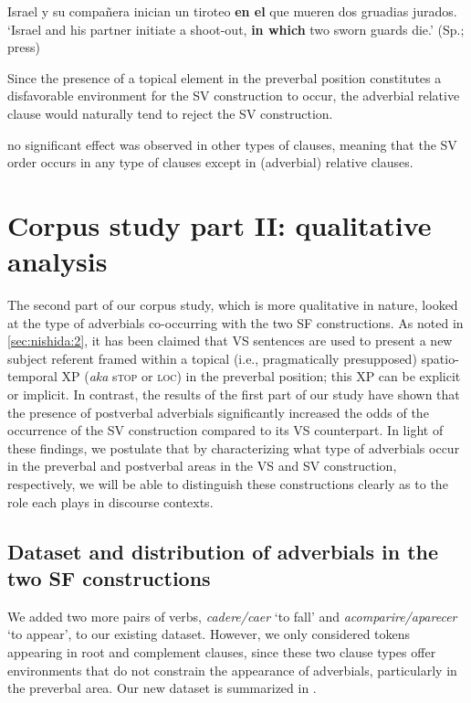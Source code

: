 \documentclass[output=paper,colorlinks,citecolor=brown,
]{langscibook}
\begin{document}
{\begin{exe}
\ex\label{ex:nishida:ii}
Israel y su compañera inician un tiroteo \textbf{en el} que mueren dos gruadias jurados. 
        \glt ‘Israel and his partner initiate a shoot-out, \textbf{in which} two sworn guards die.’ (Sp.; press)  
\end{exe}

Since the presence of a topical element in the preverbal position constitutes a disfavorable environment for the SV construction to occur, the adverbial relative clause would naturally tend to reject the SV construction.} no significant effect was observed in other types of clauses, meaning that the SV order occurs in any type of clauses except in (adverbial) relative clauses.

\section{Corpus study part II: qualitative analysis}\label{sec:nishida:4}

The second part of our corpus study, which is more qualitative in nature, looked at the type of adverbials co-occurring with the two SF constructions. As noted in \ref{sec:nishida:2}, it has been claimed that VS sentences are used to present a new subject referent framed within a topical (i.e., pragmatically presupposed) spatio-temporal XP (\textit{aka} s\textsc{top} or \textsc{loc}) in the preverbal position; this XP can be explicit or implicit. In contrast, the results of the first part of our study have shown that the presence of postverbal adverbials significantly increased the odds of the occurrence of the SV construction compared to its VS counterpart. In light of these findings, we postulate that by characterizing what type of adverbials occur in the preverbal and postverbal areas in the VS and SV construction, respectively, we will be able to distinguish these constructions clearly as to the role each plays in discourse contexts.

\subsection{Dataset and distribution of adverbials in the two SF constructions}

We added two more pairs of verbs, \textit{cadere/caer} `to fall' and \textit{acomparire/aparecer} `to appear', to our existing dataset. However, we only considered tokens appearing in root and complement clauses, since these two clause types offer environments that do not constrain the appearance of adverbials, particularly in the preverbal area. Our new dataset is summarized in .  
\end{document}

